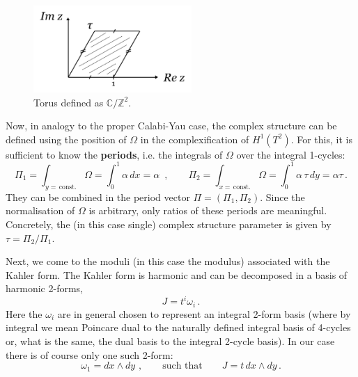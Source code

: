 \documentclass[12pt]{article}
\newcommand{\be}{\begin{equation}}
\newcommand{\ee}{\end{equation}}
\numberwithin{equation}{section}
\begin{document}
\begin{figure}[ht]
\begin{center} 
\includegraphics[width=6cm]{t2z.png}
\caption{Torus defined as $\mathbb{C}/\mathbb{Z}^2$.}
\label{t2z} 
\end{center}
\end{figure}

Now, in analogy to the proper Calabi-Yau case, the complex structure can be defined using the position of $\Omega$ in the complexification of $H^1(T^2)$. For this, it is sufficient to know the {\bf periods}, i.e. the integrals of $\Omega$ over the integral 1-cycles:
\be
\Pi_1=\int_{y=\,\mbox{const.}}\Omega=\int_0^1\alpha\,dx=\alpha\,\,\,,\qquad
\Pi_2=\int_{x=\,\mbox{const.}}\Omega=\int_0^1\alpha\,\tau\,dy=\alpha\tau\,.
\ee
They can be combined in the period vector $\Pi=(\Pi_1,\Pi_2)$. Since the normalisation of $\Omega$ is arbitrary, only ratios of these periods are meaningful. Concretely, the (in this case single) complex structure parameter is given by $\tau=\Pi_2/\Pi_1$. 

Next, we come to the moduli (in this case the modulus) associated with the Kahler form. The Kahler form is harmonic and can be decomposed in a basis of harmonic 2-forms,
\be
J=t^i\omega_i\,.
\ee
Here the $\omega_i$ are in general chosen to represent an integral 2-form basis (where by integral we mean Poincare dual to the naturally defined integral basis of 4-cycles or, what is the same, the dual basis to the integral 2-cycle basis). In our case there is of course only one such 2-form:
\be
\omega_1=dx\wedge dy\,\,,\qquad \mbox{such that}\qquad 
J=t\,dx\wedge dy\,.
\ee
\end{document}
